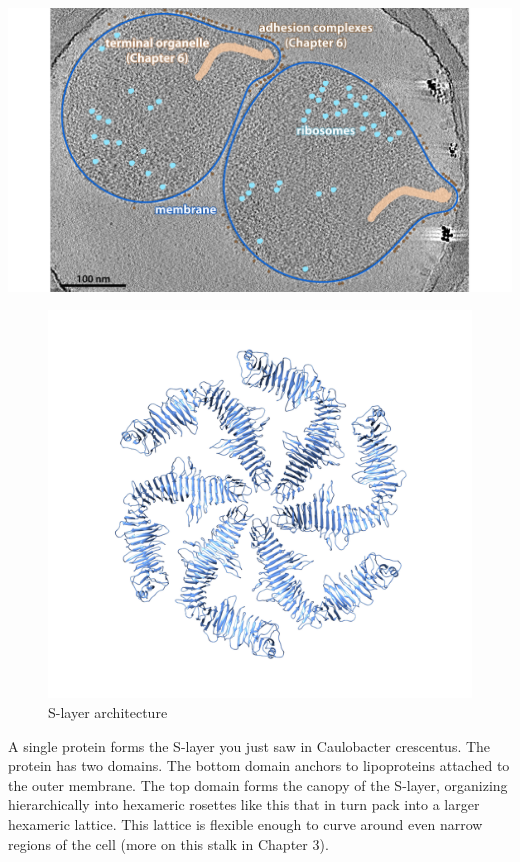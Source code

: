 \documentclass[]{tufte-book}
\begin{document}
\includegraphics{img/02_static/2_1_Mgenitalium}

\begin{figure}
\includegraphics{img/02_schematic/2_6_1_SLayerTop} \caption[S-layer architecture]{S-layer architecture}\label{fig:2-6-1}
\end{figure}

A single protein forms the S-layer you just saw in Caulobacter
crescentus. The protein has two domains. The bottom domain anchors to
lipoproteins attached to the outer membrane. The top domain forms the
canopy of the S-layer, organizing hierarchically into hexameric rosettes
like this that in turn pack into a larger hexameric lattice. This
lattice is flexible enough to curve around even narrow regions of the
cell (more on this stalk in Chapter 3).
\end{document}
